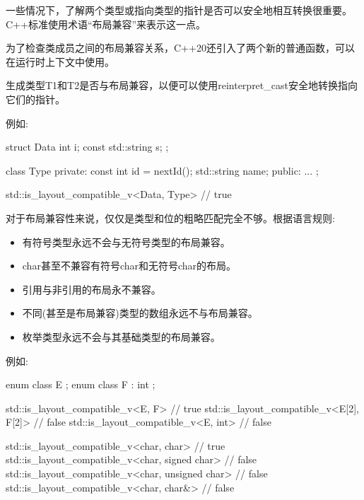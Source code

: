 
一些情况下，了解两个类型或指向类型的指针是否可以安全地相互转换很重要。C++标准使用术语“布局兼容”来表示这一点。

为了检查类成员之间的布局兼容关系，C++20还引入了两个新的普通函数，可以在运行时上下文中使用。



生成类型T1和T2是否与布局兼容，以便可以使用reinterpret\_cast安全地转换指向它们的指针。

例如:

\begin{cpp}
struct Data {
	int i;
	const std::string s;
};

class Type {
	private:
	const int id = nextId();
	std::string name;
	public:
	...
};

std::is_layout_compatible_v<Data, Type> // true
\end{cpp}

对于布局兼容性来说，仅仅是类型和位的粗略匹配完全不够。根据语言规则:

\begin{itemize}
\item
有符号类型永远不会与无符号类型的布局兼容。

\item
char甚至不兼容有符号char和无符号char的布局。

\item
引用与非引用的布局永不兼容。

\item
不同(甚至是布局兼容)类型的数组永远不与布局兼容。

\item
枚举类型永远不会与其基础类型的布局兼容。
\end{itemize}

例如:

\begin{cpp}
enum class E {};
enum class F : int {};

std::is_layout_compatible_v<E, F> // true
std::is_layout_compatible_v<E[2], F[2]> // false
std::is_layout_compatible_v<E, int> // false

std::is_layout_compatible_v<char, char> // true
std::is_layout_compatible_v<char, signed char> // false
std::is_layout_compatible_v<char, unsigned char> // false
std::is_layout_compatible_v<char, char&> // false
\end{cpp}


